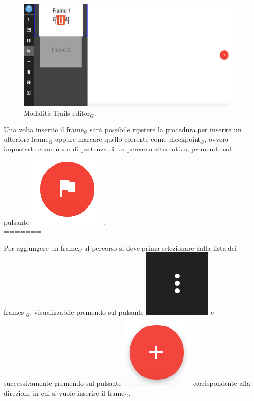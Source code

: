 \begin{figure}[!h]
\begin{center}
\includegraphics[scale=0.35]{img/trail_frames_list.png}
\caption{Modalità Trails editor$_G$.}
\end{center}
\end{figure}

Una volta inserito il frame$_G$ sarà possibile ripetere la procedura per inserire un ulteriore frame$_G$ oppure marcare quello corrente come checkpoint$_G$, ovvero impostarlo come nodo di partenza di un percorso alternativo, premendo sul pulsante \includegraphics[scale=0.4]{img/checkpoint.png}.\\

=======

Per aggiungere un frame$_G$ al percorso si deve prima selezionare dalla lista dei frames $_G$, visualizzabile premendo sul pulsante \includegraphics[scale=0.4]{img/frames_to_be_added.png} e successivamente premendo sul pulsante \includegraphics[scale=0.4]{img/add.png} corrispondente alla direzione in cui si vuole inserire il frame$_G$.\\


